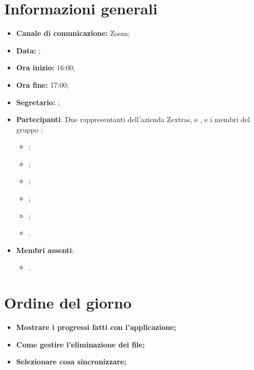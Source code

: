\section{Informazioni generali}

\begin{itemize}

    \item \textbf{Canale di comunicazione:} Zoom;

    \item \textbf{Data:} \DataMeeting{};

    \item \textbf{Ora inizio:} 16:00;

    \item \textbf{Ora fine:} 17:00;

    \item \textbf{Segretario:} \ACapoRedazione{};

    \item \textbf{Partecipanti}: Due rappresentanti dell'azienda Zextras, \textit{\Alessio{}} e \textit{\Federico{}}, e i membri del gruppo \Gruppo{}:
        \begin{itemize}
            \item \Daniele{};
            \item \Davide{};
            \item \Francesco{};
            \item \Giosue{};
            \item \Lucrezia{};
            \item \Matteo{}.
        \end{itemize}
    \item \textbf{Membri assenti}:
        \begin{itemize}
            \item \Tommaso{}.
        \end{itemize}
\end{itemize}

\section{Ordine del giorno}

\begin{itemize}
    \item\textbf{Mostrare i progressi fatti con l'applicazione;}
    \item\textbf{Come gestire l'eliminazione dei file;}
    \item\textbf{Selezionare cosa sincronizzare;}
\end{itemize}
\newpage


